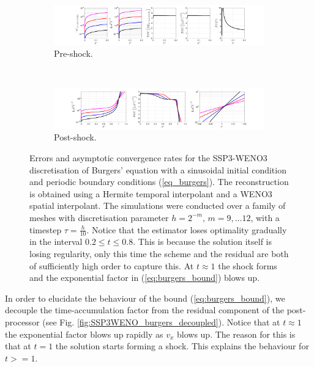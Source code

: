 \documentclass[final]{amsart}
\numberwithin{equation}{section}
\begin{document}
\begin{figure}[H]
	\begin{subfigure}[b]{\textwidth}
		\includegraphics[width=\textwidth]{../figures/fig_SSP3WENO3_prehockplots_1x5_sin_IC_P3_burgers}	
		\caption{
			\label{fig:SSP3WENO3_burgers_P3_preshock}
			Pre-shock.
		}
	\end{subfigure}
	\\
	\begin{subfigure}[b]{\textwidth}
		\includegraphics[width=\textwidth]{../figures/fig_SSP3WENO3_postshockplots_1x5_sin_IC_P3_burgers}	
		\caption{\label{fig:SSP3WENO3_burgers_P3_postshock}
			Post-shock. 
		}
	\end{subfigure}
	\caption{\label{fig:SSP3WENO_burgers} Errors and asymptotic
          convergence rates for the SSP3-WENO3 discretisation of Burgers' equation with a
          sinusoidal initial condition and periodic boundary
          conditions (\ref{eq_burgers}).  The reconstruction is obtained using  a Hermite temporal interpolant and a WENO3 spatial interpolant.  The simulations were
          conducted over a family of meshes with discretisation
          parameter $h = 2^{-m}, \,m = 9,\dots 12$, with a timestep
          $\tau = \tfrac{h}{10}$.  Notice that  the estimator loses optimality gradually in the interval $0.2\leq t \leq 0.8$.  This is because the solution itself is losing regularity, only this time the scheme and the residual are both of sufficiently high order  to capture this.  At $t\approx 1$ the shock forms and the exponential factor in (\ref{eq:burgers_bound})  blows up.}
\end{figure}
In order to elucidate the behaviour of the bound (\ref{eq:burgers_bound}), we decouple  the time-accumulation factor from the residual component of the post-processor (see Fig. \ref{fig:SSP3WENO_burgers_decoupled}).  Notice that at $ t\approx1$ the exponential factor blows up rapidly as $v_x$ blows up.  The reason for this is that at $t=1$ the solution starts forming a shock.  This explains the behaviour for $t>=1$.  
\end{document}
